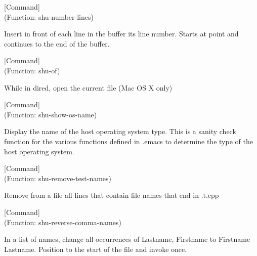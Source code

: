 \vspace{1em}
\noindent
{}
\usebox{\funcname}
 \hfill [Command]\\%
 (Function: shu-number-lines)

\begin{doc-string}
Insert in front of each line in the buffer its line number.  Starts
at point and continues to the end of the buffer.
\end{doc-string}

\vspace{1em}
\noindent
{}
\usebox{\funcname}
 \hfill [Command]\\%
 (Function: shu-of)

\begin{doc-string}
While in dired, open the current file (Mac OS X only)
\end{doc-string}

\vspace{1em}
\noindent
{}
\usebox{\funcname}
 \hfill [Command]\\%
 (Function: shu-show-os-name)

\begin{doc-string}
Display the name of the host operating system type.  This is a sanity check
function for the various functions defined in .emacs to determine the type of
the host operating system.
\end{doc-string}

\vspace{1em}
\noindent
{}
\usebox{\funcname}
 \hfill [Command]\\%
 (Function: shu-remove-test-names)

\begin{doc-string}
Remove from a file all lines that contain file names that end in .t.cpp
\end{doc-string}

\vspace{1em}
\noindent
{}
\usebox{\funcname}
 \hfill [Command]\\%
 (Function: shu-reverse-comma-names)

\begin{doc-string}
In a list of names, change all occurrences
of Lastname, Firstname to Firstname Lastname.
Position to the start of the file and invoke once.
\end{doc-string}

